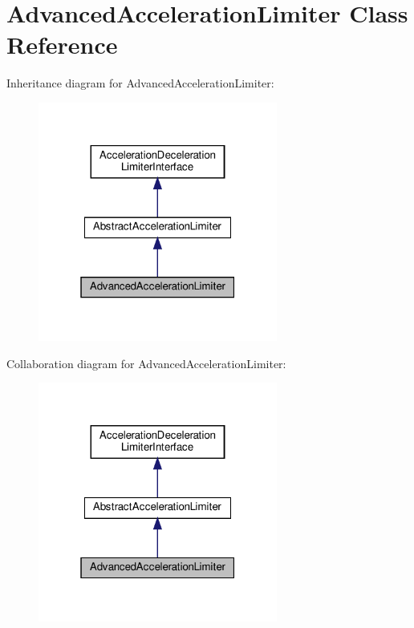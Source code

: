 \hypertarget{classAdvancedAccelerationLimiter}{}\section{Advanced\+Acceleration\+Limiter Class Reference}
\label{classAdvancedAccelerationLimiter}


Inheritance diagram for Advanced\+Acceleration\+Limiter\+:
\nopagebreak
\begin{figure}[H]
\begin{center}
\leavevmode
\includegraphics[width=223pt]{classAdvancedAccelerationLimiter__inherit__graph}
\end{center}
\end{figure}


Collaboration diagram for Advanced\+Acceleration\+Limiter\+:
\nopagebreak
\begin{figure}[H]
\begin{center}
\leavevmode
\includegraphics[width=223pt]{classAdvancedAccelerationLimiter__coll__graph}
\end{center}
\end{figure}
